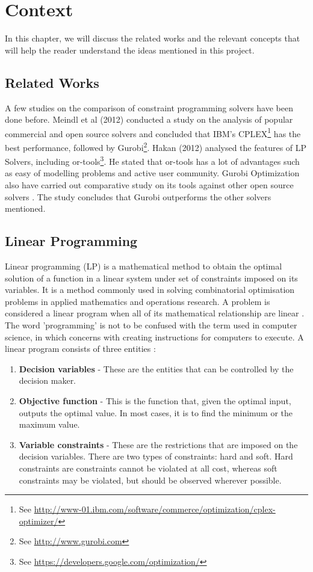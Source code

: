 \chapter{Context}
In this chapter, we will discuss the related works and the relevant concepts that will help the reader understand the ideas
mentioned in this project.

\section{Related Works}
A few studies on the comparison of constraint programming solvers have been done before.
Meindl et al (2012) \cite{Meindl2012} conducted a study on the analysis of popular commercial and open source solvers and concluded
that IBM's CPLEX\footnote{See \url{http://www-01.ibm.com/software/commerce/optimization/cplex-optimizer/}} has the best performance,
followed by Gurobi\footnote{See \url{http://www.gurobi.com}}. Hakan (2012) \cite{Hakan2012} analysed the features of
LP Solvers, including or-tools\footnote{See \url{https://developers.google.com/optimization/}}.
 He stated that or-tools has a lot of advantages such as easy of modelling problems and
active user community. Gurobi Optimization also have carried out comparative study on its tools against other open
source solvers \cite{gurobi:solvers}. The study concludes that Gurobi outperforms the other solvers mentioned.

\section{Linear Programming}
Linear programming (LP) is a mathematical method to obtain the optimal solution of a function in a linear system under set of constraints
imposed on its variables. It is a method commonly used in solving combinatorial optimisation problems in applied mathematics and operations research.
A problem is considered a linear program when all of its mathematical relationship are linear \cite{APMBradley}.
The word 'programming' is not to be confused with the term used in computer science,
in which concerns with creating instructions for computers to execute. A linear
program consists of three entities \cite{LPChvatal,ILPCoursera}:
\begin{enumerate}
\item \textbf{Decision variables} - These are the entities that can be controlled by the decision maker.
\item \textbf{Objective function} - This is the function that, given the optimal input, outputs the optimal value.
In most cases, it is to find the minimum or the maximum value.
\item \textbf{Variable constraints} - These are the restrictions that are imposed on the decision variables. There are two types
of constraints: hard and soft. Hard constraints are constraints cannot be violated at all cost, whereas soft constraints may be
violated, but should be observed wherever possible.
\end{enumerate}

